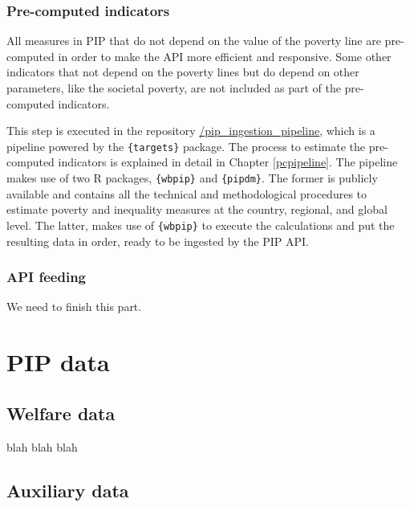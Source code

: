 \documentclass[
]{book}
\begin{document}
\hypertarget{pre-computed-indicators}{%
\section{Pre-computed indicators}\label{pre-computed-indicators}}

All measures in PIP that do not depend on the value of the poverty line are
pre-computed in order to make the API more efficient and responsive. Some other
indicators that not depend on the poverty lines but do depend on other
parameters, like the societal poverty, are not included as part of the
pre-computed indicators.

This step is executed in the repository
\href{https://github.com/PIP-Technical-Team/pip_ingestion_pipeline}{/pip\_ingestion\_pipeline},
which is a pipeline powered by the \texttt{\{targets\}} package. The process to estimate
the pre-computed indicators is explained in detail in Chapter \ref{pcpipeline}.
The pipeline makes use of two R packages, \texttt{\{wbpip\}} and \texttt{\{pipdm\}}. The former is
publicly available and contains all the technical and methodological procedures
to estimate poverty and inequality measures at the country, regional, and global
level. The latter, makes use of \texttt{\{wbpip\}} to execute the calculations and put
the resulting data in order, ready to be ingested by the PIP API.

\hypertarget{api-feeding}{%
\section{API feeding}\label{api-feeding}}

{We need to finish this part}.

\hypertarget{part-pip-data}{%
\part{PIP data}\label{part-pip-data}}

\hypertarget{welfare-data}{%
\chapter{Welfare data}\label{welfare-data}}

blah blah blah

\hypertarget{auxiliary-data}{%
\chapter{Auxiliary data}\label{auxiliary-data}}
\end{document}
